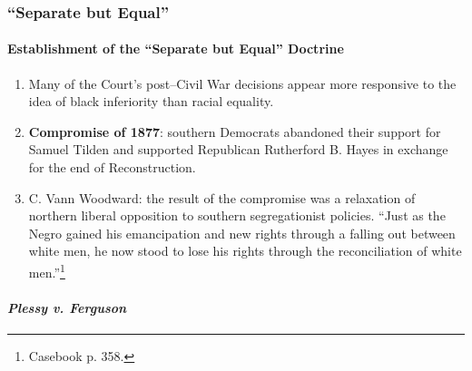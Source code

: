% 
% 
% 
\subsubsection{``Separate but Equal''}

\paragraph{Establishment of the ``Separate but Equal'' Doctrine}

\begin{enumerate}
    \item Many of the Court's post--Civil War decisions appear more 
    responsive to the idea of black inferiority than racial equality.
    \item \textbf{Compromise of 1877}: southern Democrats abandoned their 
    support for Samuel Tilden and supported Republican Rutherford B. Hayes in 
    exchange for the end of Reconstruction.
    \item C. Vann Woodward: the result of the compromise was a relaxation of 
    northern liberal opposition to southern segregationist policies. ``Just as 
    the Negro gained his emancipation and new rights through a falling out 
    between white men, he now stood to lose his rights through the 
    reconciliation of white men.''\footnote{Casebook p. 358.}
\end{enumerate}

\paragraph{\emph{Plessy v. Ferguson}}

